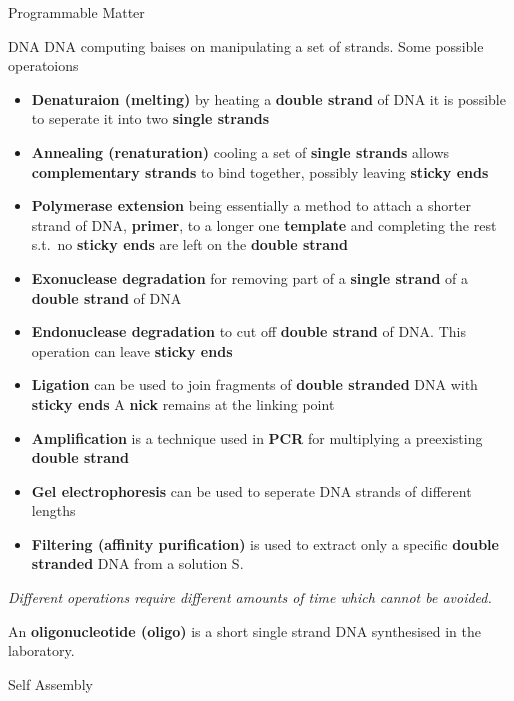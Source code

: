 \documentclass[12pt, letterpaper]{article}
\begin{document}
\begin{section}{Programmable Matter}
\begin{subsection}{DNA}
    DNA computing baises on manipulating a set of strands.
    Some possible operatoions
    \begin{itemize}
      \item \textbf{Denaturaion (melting)} by heating a \textbf{double strand}
            of DNA it is possible to seperate it into two
            \textbf{single strands}
      \item \textbf{Annealing (renaturation)} cooling a set of
            \textbf{single strands} allows \textbf{complementary strands} to
            bind together, possibly leaving \textbf{sticky ends}
      \item \textbf{Polymerase extension} being essentially a method to attach
            a shorter strand of DNA, \textbf{primer}, to a longer one
            \textbf{template} and completing the rest s.t.\ no
            \textbf{sticky ends} are left on the \textbf{double strand}
      \item \textbf{Exonuclease degradation} for removing part of a
            \textbf{single strand} of a \textbf{double strand} of DNA
      \item \textbf{Endonuclease degradation} to cut off \textbf{double strand}
            of DNA. This operation can leave \textbf{sticky ends}
      \item \textbf{Ligation} can be used to join fragments of
            \textbf{double stranded} DNA with \textbf{sticky ends}
            A \textbf{nick} remains at the linking point
      \item \textbf{Amplification} is a technique used in \textbf{PCR} for
            multiplying a preexisting \textbf{double strand}
      \item \textbf{Gel electrophoresis} can be used to seperate DNA strands of
            different lengths
      \item \textbf{Filtering (affinity purification)} is used to extract only
            a specific \textbf{double stranded} DNA from a solution S.
    \end{itemize}

    \textit{Different operations require different amounts of time which
      cannot be avoided.}

    An \textbf{oligonucleotide (oligo)} is a short single strand DNA
    synthesised in the laboratory.

  \end{subsection}

  \newpage

  \begin{subsection}{Self Assembly}


\end{subsection}
\end{section}
\end{document}
